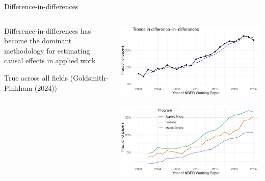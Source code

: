 \documentclass[notes,11pt, aspectratio=169]{beamer}
\newenvironment{wideitemize}{\itemize\addtolength{\itemsep}{10pt}}{\enditemize}
\begin{document}
\begin{frame}{Difference-in-differences}
  \begin{columns}[T] %
    \begin{column}{.5\textwidth}
      \begin{wideitemize}
      \item Difference-in-differences has become the dominant methodology
        for estimating causal effects in applied work
        \item True across all fields (Goldsmith-Pinkham (2024))
      \end{wideitemize}
    \end{column}%
    \hfill%
    \begin{column}{.5\textwidth}
\vspace{-10pt}
      \begin{center}
        \includegraphics[width=\linewidth]{images/extend_results_didforguido.pdf}

        \includegraphics[width=\linewidth]{images/extend_results_didby_group.pdf}
          \end{center}
    \end{column}%
  \end{columns}
\end{frame}
\end{document}

